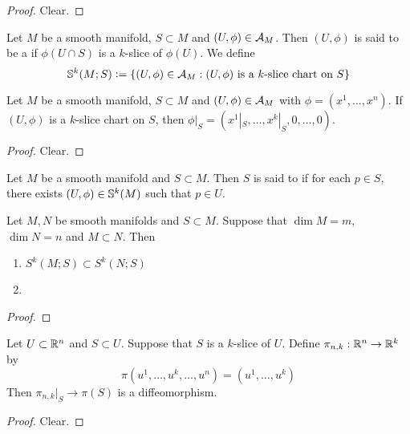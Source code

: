 \documentclass{book}
\begin{document}
	\begin{proof}
		Clear.
	\end{proof}
	
	\begin{defn}
	Let $M$ be a smooth manifold, $S \subset M$ and $(U, \phi) \in \MA_M$. Then $(U, \phi)$ is said to be a  if $\phi(U \cap S)$ is a $k$-slice of $\phi(U)$. We define
	$$\S^k(M; S) \defeq \{(U, \phi) \in \MA_M: \text{$(U, \phi)$ is a $k$-slice chart on $S$}\}$$
	\end{defn}	
	
	\begin{ex}
	Let $M$ be a smooth manifold, $S \subset M$ and $(U, \phi) \in \MA_M$ with $\phi = (x^1, \dots, x^n)$. If $(U, \phi)$ is a $k$-slice chart on $S$, then $\phi|_S = (x^1|_S, \dots, x^k|_S, 0, \dots, 0)$.
	\end{ex}
	
	\begin{proof}
	Clear. 
	\end{proof}
	
	\begin{defn}
	Let $M$ be a smooth manifold and $S \subset M$. Then $S$ is said to  if for each $p \in S$, there exists $(U, \phi) \in \S^k(M)$ such that $p \in U$. 
	\end{defn}

	\begin{ex}
		Let $M, N$ be smooth manifolds and $S \subset M$. Suppose that $\dim M = m$, $\dim N = n$ and $M \subset N$. Then  
		\begin{enumerate}
			\item $S^{k}(M;S) \subset S^k(N;S)$
			\item 
		\end{enumerate}
	\end{ex}

	\begin{proof}
		\tcr{FINISH!!!}
	\end{proof}

	\begin{ex}
		Let $U \subset \R^n$ and $S \subset U$. Suppose that $S$ is a $k$-slice of $U$. Define $\pi_{n,k}: \R^n \rightarrow \R^k$ by $$\pi(u^1, \dots, u^k, \dots, u^n) = (u^1, \dots, u^k)$$ Then $\pi_{n,k}|_{S} \rightarrow \pi(S)$ is a diffeomorphism.
	\end{ex}	
	
	\begin{proof}
		Clear. 
	\end{proof}
\end{document}
